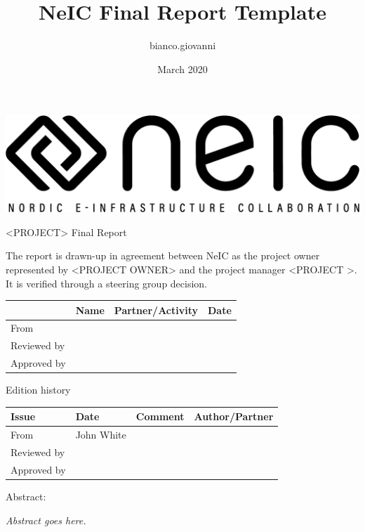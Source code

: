 \documentclass{article}
\title{NeIC Final Report Template}
\author{bianco.giovanni }
\date{March 2020}
\begin{document}
\begin{center}
\includegraphics[width=\textwidth]{neic_logo_large.png}
\end{center}

\vspace{0.5in}
{\Huge <PROJECT> Final Report} \hline
\vspace{0.5in}

\noindent
{\large
{The report is drawn-up in agreement between NeIC as the project owner represented by <PROJECT OWNER> and the project manager <PROJECT >. It is verified through a steering group decision.
}
}

\begin{center}
\begin{tabular}{|l| l| l| l|} \hline

& Name
& Partner/Activity
& Date \\ \hline
From & 
 &
& 
\\ \hline
Reviewed by &
& 
& 
\\ \hline
Approved by &
& 
& 
\\ \hline
\end{tabular}
\end{center}

Edition history

\begin{center}
\begin{tabular}{|l| l| l| l|} \hline
Issue
& Date
& Comment
& Author/Partner \\ \hline
From & 
John White &
& 
\\ \hline
Reviewed by &
& 
& 
\\ \hline
Approved by &
& 
& 
\\ \hline
\end{tabular}
\end{center}

Abstract:

{\it Abstract goes here.}
\end{document}
